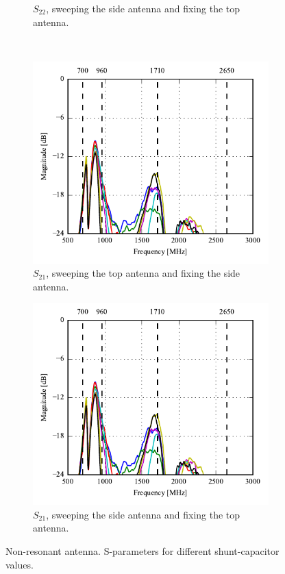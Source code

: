 \begin{figure}[htbp]
\begin{subfigure}{0.49\linewidth}
        \caption{$S_{22}$, sweeping the side antenna and fixing the top antenna.}
    \end{subfigure}
    \\
    \begin{subfigure}{0.49\linewidth}
        \centering
        \includegraphics{img/tech_sol/nonresonant/prototype/s21_csh1.pdf}
        \caption{$S_{21}$, sweeping the top antenna and fixing the side antenna.}
    \end{subfigure}
    \hfill
    \begin{subfigure}{0.49\linewidth}
        \centering
        \includegraphics{img/tech_sol/nonresonant/prototype/s12_csh1.pdf}
        \caption{$S_{21}$, sweeping the side antenna and fixing the top antenna.}
    \end{subfigure}
    \caption{Non-resonant antenna. S-parameters for different shunt-capacitor values.}
    \label{fig:nonresonant_proto_sweep_sparams}
\end{figure}